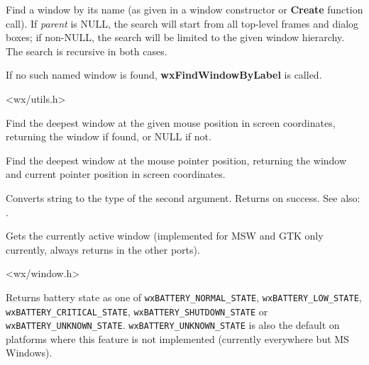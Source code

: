 Find a window by its name (as given in a window constructor or {\bf Create} function call).
If {\it parent} is NULL, the search will start from all top-level
frames and dialog boxes; if non-NULL, the search will be limited to the given window hierarchy.
The search is recursive in both cases.

If no such named window is found, {\bf wxFindWindowByLabel} is called.


<wx/utils.h>


\label{wxfindwindowatpoint}


Find the deepest window at the given mouse position in screen coordinates,
returning the window if found, or NULL if not.


\label{wxfindwindowatpointer}


Find the deepest window at the mouse pointer position, returning the window
and current pointer position in screen coordinates.


\label{wxfromstring}



Converts string to the type of the second argument. Returns \true on success.
See also: .


\label{wxgetactivewindow}


Gets the currently active window (implemented for MSW and GTK only currently,
always returns \NULL in the other ports).


<wx/window.h>


\label{wxgetbatterystate}


Returns battery state as one of \texttt{wxBATTERY\_NORMAL\_STATE},
\texttt{wxBATTERY\_LOW\_STATE}, \texttt{wxBATTERY\_CRITICAL\_STATE},
\texttt{wxBATTERY\_SHUTDOWN\_STATE} or \texttt{wxBATTERY\_UNKNOWN\_STATE}.
\texttt{wxBATTERY\_UNKNOWN\_STATE} is also the default on platforms where
this feature is not implemented (currently everywhere but MS Windows).

